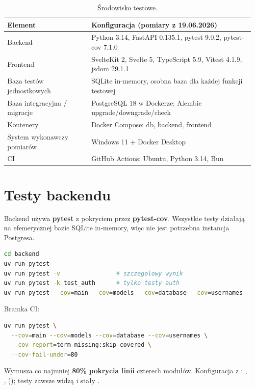 \begin{table}[H]
\centering\small
\begin{tabularx}{\textwidth}{@{}p{}Y@{}}
\toprule
\textbf{Element} & \textbf{Konfiguracja (pomiary z 19.06.2026)} \\
\midrule
Backend & Python 3.14, FastAPI 0.135.1, pytest 9.0.2, pytest-cov 7.1.0 \\
Frontend & SvelteKit 2, Svelte 5, TypeScript 5.9, Vitest 4.1.9, jsdom 29.1.1 \\
Baza testów jednostkowych & SQLite in-memory, osobna baza dla każdej funkcji testowej \\
Baza integracyjna / migracje & PostgreSQL 18 w Dockerze; Alembic upgrade/downgrade/check \\
Kontenery & Docker Compose: db, backend, frontend \\
System wykonawczy pomiarów & Windows 11 + Docker Desktop \\
CI & GitHub Actions: Ubuntu, Python 3.14, Bun \\
\bottomrule
\end{tabularx}
\caption{Środowisko testowe.}
\end{table}

\section{Testy backendu}
\label{sec:op-testy-backend}

Backend używa \textbf{pytest} z pokryciem przez \textbf{pytest-cov}. Wszystkie testy
działają na efemerycznej bazie SQLite in-memory, więc nie jest potrzebna instancja
Postgresa.

\begin{lstlisting}[language=bash]
cd backend
uv run pytest
uv run pytest -v                # szczegolowy wynik
uv run pytest -k test_auth      # tylko testy auth
uv run pytest --cov=main --cov=models --cov=database --cov=usernames
\end{lstlisting}

Bramka CI:

\begin{lstlisting}[language=bash]
uv run pytest \
  --cov=main --cov=models --cov=database --cov=usernames \
  --cov-report=term-missing:skip-covered \
  --cov-fail-under=80
\end{lstlisting}

Wymusza co najmniej \textbf{80\% pokrycia linii} czterech modułów. Konfiguracja z
: , ,
 (); testy
zawsze widzą \code{DATABASE_URL=sqlite://} i stały \code{JWT_SECRET}.

